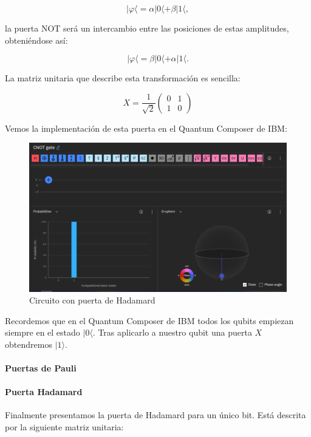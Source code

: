 \documentclass[11pt]{article}
\newcommand{\ra}{\rangle}
\newcommand{\la}{\langle}
\begin{document}
\[
	|\varphi\la = \alpha |0\la + \beta |1\la,
\]

la puerta NOT será un intercambio entre las posiciones de estas amplitudes, obteniéndose así:

\[
	|\varphi\la = \beta |0\la + \alpha |1\la.
\]

La matriz unitaria que describe esta transformación es sencilla:

\[
X = \frac{1}{\sqrt 2}
\begin{pmatrix}
	0 & 1 \\
	1 & 0 
\end{pmatrix}
\]

Vemos la implementación de esta puerta en el Quantum Composer de IBM:

\begin{figure}[H]
	\centering
	\includegraphics[scale=0.8]{figures/gate-x.png}
	\caption{Circuito con puerta de Hadamard}
\end{figure}

Recordemos que en el Quantum Composer de IBM todos los qubits empiezan siempre en el estado $|0\la$. Tras aplicarlo a nuestro qubit una puerta $X$ obtendremos $|1\ra$.

\paragraph*{Puertas de Pauli}



\paragraph*{Puerta Hadamard}

Finalmente presentamos la puerta de Hadamard para un único bit. Está descrita por la siguiente matriz unitaria:
\end{document}
